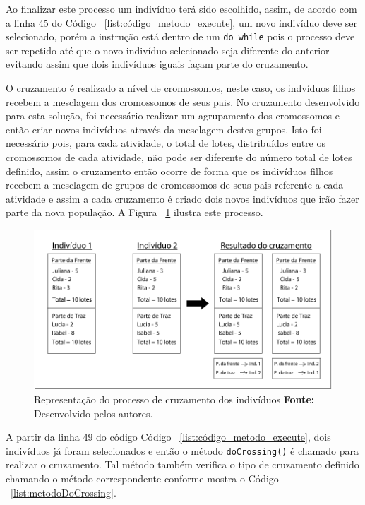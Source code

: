 \par Ao finalizar este processo um indivíduo terá sido escolhido, assim, de acordo com a linha 45 do Código ~\ref{list:código_metodo_execute},
um novo indivíduo deve ser selecionado, porém a instrução está dentro de um \texttt{do while} pois o processo deve ser repetido até que 
o novo indivíduo selecionado seja diferente do anterior evitando assim que dois indivíduos iguais façam parte do cruzamento.

\par O cruzamento é realizado a nível de cromossomos, neste caso, os indvíduos filhos recebem 
a mesclagem dos cromossomos de seus pais. No cruzamento desenvolvido para esta solução, foi 
necessário realizar um agrupamento dos cromossomos e então criar novos indivíduos através da
mesclagem destes grupos. Isto foi necessário pois, para cada atividade, o total de lotes,
distribuídos entre os cromossomos de cada atividade, não pode ser diferente do número total de lotes definido, assim o 
cruzamento então ocorre de forma que os indivíduos filhos recebem a mesclagem de grupos de 
cromossomos de seus pais referente a cada atividade e assim a cada cruzamento é criado
dois novos indivíduos que irão fazer parte da nova população. A Figura ~\ref{fig:ex_cruzamento} ilustra este processo.

\begin{figure}[h!]
	\centerline{\includegraphics[scale=0.4]{./imagens/ex_cruzamento.png}}
	\caption[Cruzamento dos indivíduos]
	{Representação do processo de cruzamento dos indivíduos
		\textbf{Fonte:} Desenvolvido pelos autores.}
	\label{fig:ex_cruzamento}
\end{figure}


\par A partir da linha 49 do código Código ~\ref{list:código_metodo_execute}, dois indivíduos já foram selecionados e então o 
método \texttt{doCrossing()} é chamado para realizar o cruzamento. Tal método também verifica o tipo de cruzamento definido
chamando o método correspondente conforme mostra o Código ~\ref{list:metodoDoCrossing}. 



